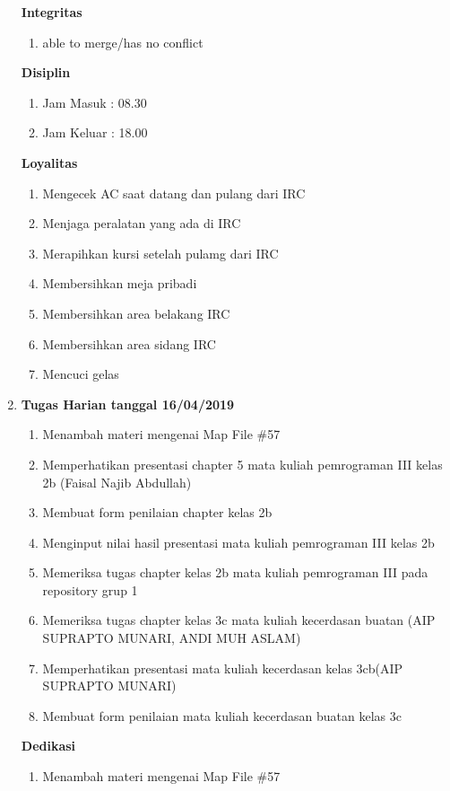 \begin{enumerate}
\textbf{Integritas}
\begin{enumerate}
\item able to merge/has no conflict
\end{enumerate}

\textbf{Disiplin}
\begin{enumerate}
\item Jam Masuk : 08.30
\item Jam Keluar : 18.00
\end{enumerate}

\textbf{Loyalitas}
\begin{enumerate}
\item Mengecek AC saat datang dan pulang dari IRC
\item Menjaga peralatan yang ada di IRC
\item Merapihkan kursi setelah pulamg dari IRC
\item Membersihkan meja pribadi
\item Membersihkan area belakang IRC
\item Membersihkan area sidang IRC
\item Mencuci gelas
\end{enumerate}



\item \textbf{Tugas Harian tanggal 16/04/2019}
\begin{enumerate}
\item Menambah materi mengenai Map File \#57
\item Memperhatikan presentasi chapter 5 mata kuliah pemrograman III kelas 2b (Faisal Najib Abdullah)
\item Membuat form penilaian chapter kelas 2b
\item Menginput nilai hasil presentasi mata kuliah pemrograman III kelas 2b
\item Memeriksa tugas chapter kelas 2b mata kuliah pemrograman III pada repository grup 1
\item Memeriksa tugas chapter kelas 3c mata kuliah kecerdasan buatan (AIP SUPRAPTO MUNARI, ANDI MUH ASLAM)
\item Memperhatikan presentasi mata kuliah kecerdasan kelas 3cb(AIP SUPRAPTO MUNARI)
\item Membuat form penilaian mata kuliah kecerdasan buatan kelas 3c 
\end{enumerate}

\textbf{Dedikasi}
\begin{enumerate}
\item Menambah materi mengenai Map File \#57
\end{enumerate}


\end{enumerate}
